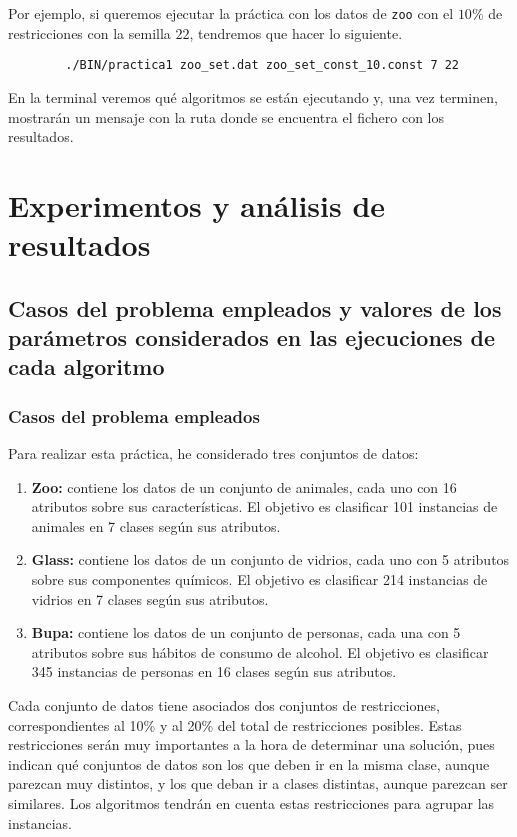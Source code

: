 			Por ejemplo, si queremos ejecutar la práctica con los datos de \lstinline!zoo! con el $10$\% de restricciones con la semilla $22$,
			tendremos que hacer lo siguiente.

		\footnotesize
		\begin{lstlisting}
		./BIN/practica1 zoo_set.dat zoo_set_const_10.const 7 22 
		\end{lstlisting}
		\normalsize

			En la terminal veremos qué algoritmos se están ejecutando y, una vez terminen, mostrarán un mensaje con la ruta donde se encuentra 
			el fichero con los resultados.
\newpage

\section{Experimentos y análisis de resultados}


\subsection{Casos del problema empleados y valores de los parámetros considerados en las ejecuciones de cada algoritmo}

\subsubsection{Casos del problema empleados}

Para realizar esta práctica, he considerado tres conjuntos de datos:

\begin{enumerate}
	\item \textbf{Zoo:} contiene los datos de un conjunto de animales, cada uno con 16 atributos sobre sus características. 
	El objetivo es clasificar 101 instancias de animales en 7 clases según sus atributos.
	\item \textbf{Glass:} contiene los datos de un conjunto de vidrios, cada uno con 5 atributos sobre sus componentes químicos.
	El objetivo es clasificar 214 instancias de vidrios en 7 clases según sus atributos.
	\item \textbf{Bupa:} contiene los datos de un conjunto de personas, cada una con 5 atributos sobre sus hábitos de consumo de alcohol.
	El objetivo es clasificar 345 instancias de personas en 16 clases según sus atributos.
\end{enumerate}

Cada conjunto de datos tiene asociados dos conjuntos de restricciones, correspondientes al 10\% y al 20\% 
del total de restricciones posibles. Estas restricciones serán muy importantes a la hora de determinar una solución,
pues indican qué conjuntos de datos son los que deben ir en la misma clase, aunque parezcan muy distintos, y los que deban ir a clases distintas, aunque parezcan ser similares.
Los algoritmos tendrán en cuenta estas restricciones para agrupar las instancias.

